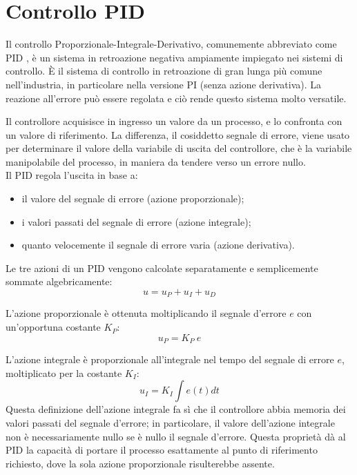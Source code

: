 \documentclass[laurea,oneside,11pt]{USiena_tesiLM}
\begin{document}
\section{Controllo PID}
Il controllo Proporzionale-Integrale-Derivativo, comunemente abbreviato come PID \cite{visioli2006practical}, è un sistema in retroazione negativa ampiamente impiegato nei sistemi di controllo. È il sistema di controllo in retroazione di gran lunga più comune nell'industria, in particolare nella versione PI (senza azione derivativa). 
La reazione all'errore può essere regolata e ciò rende questo sistema molto versatile.

Il controllore acquisisce in ingresso un valore da un processo, e lo confronta con un valore di riferimento. La differenza, il cosiddetto segnale di errore, viene  usato per determinare il valore della variabile di uscita del controllore, che è la variabile manipolabile del processo, in maniera da tendere verso un errore nullo.\\

Il PID regola l'uscita in base a:
\begin{itemize}
\item il valore del segnale di errore (azione proporzionale);
\item i valori passati del segnale di errore (azione integrale);
\item quanto velocemente il segnale di errore varia (azione derivativa).
\end{itemize}

Le tre azioni di un PID vengono calcolate separatamente e semplicemente sommate algebricamente:
\begin{equation}
u=u_P + u_I + u_D 
\end{equation}

L'azione proporzionale è ottenuta moltiplicando il segnale d'errore $e$ con un'opportuna costante $K_P$:
\begin{equation}
u_P = K_P \ e
\end{equation}

L'azione integrale è proporzionale all'integrale nel tempo del segnale di errore $e$, moltiplicato per la costante $K_I$:
\begin{equation}
u_I = K_I \int e(t) dt
\end{equation}
Questa definizione dell'azione integrale fa sì che il controllore abbia memoria dei valori passati del segnale d'errore; in particolare, il valore dell'azione integrale non è necessariamente nullo se è nullo il segnale d'errore. Questa proprietà dà al PID la capacità di portare il processo esattamente al punto di riferimento richiesto, dove la sola azione proporzionale risulterebbe assente.
\end{document}
